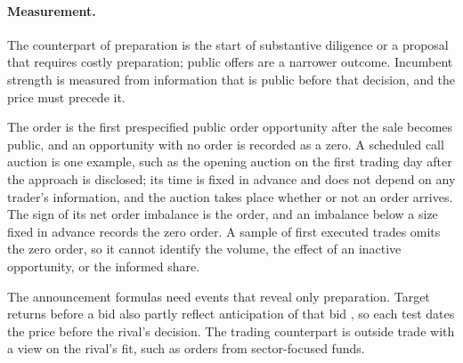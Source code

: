 \paragraph{Measurement.} The counterpart of preparation is the start of substantive diligence or a proposal that
requires costly preparation; public offers are a narrower outcome. Incumbent strength is measured from information
that is public before that decision, and the price must precede it.

The order is the first prespecified public order opportunity after the sale becomes public, and an opportunity with
no order is recorded as a zero. A scheduled call auction is one example, such as the opening auction on the first
trading day after the approach is disclosed; its time is fixed in advance and does not depend on any trader's
information, and the auction takes place whether or not an order arrives. The sign of its net order imbalance is the
order, and an imbalance below a size fixed in advance records the zero order. A sample of first executed trades omits
the zero order, so it cannot identify the volume, the effect of an inactive opportunity, or the informed share.

The announcement formulas need events that reveal only preparation. Target returns before a bid also
partly reflect anticipation of that bid \citep{Schwert1996}, so each test dates the price before the rival's
decision. The trading counterpart is outside trade with a view on the rival's fit, such as orders from sector-focused funds.

